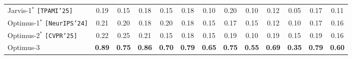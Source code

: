 \begin{table}[t]
{\begin{tabular}{lcccccccccccc}
Jarvis-1$^{*}$ \cite{wang2023jarvis} \texttt{[TPAMI'25]}   & 0.19 & 0.15 & 0.18 & 0.15 & 0.18 & 0.10 & 0.20 & 0.10 & 0.12 & 0.05 & 0.17 & 0.11 \\
Optimus-1$^{*}$ \cite{li2024optimus} \texttt{[NeurIPS'24]}   & 0.21 & 0.20 & 0.18 & 0.20 & 0.18 & 0.15 & 0.17 & 0.15 & 0.12 & 0.10 & 0.17 & 0.16 \\
Optimus-2$^{*}$ \cite{li2025optimus}  \texttt{[CVPR'25]}   & 0.22 & 0.25 & 0.21 & 0.15 & 0.18 & 0.15 & 0.19 & 0.10 & 0.19 & 0.15 & 0.19 & 0.16 \\
\hline
\rowcolor[HTML]{E7EEFE}
Optimus-3           & 
\textbf{0.89} & \textbf{0.75} & \textbf{0.86} & \textbf{0.70} & \textbf{0.79} & \textbf{0.65} & \textbf{0.75} & \textbf{0.55} & \textbf{0.69} & \textbf{0.35} & \textbf{0.79} & \textbf{0.60} \\
\bottomrule[1.2pt]
\end{tabular}
}
\end{table}